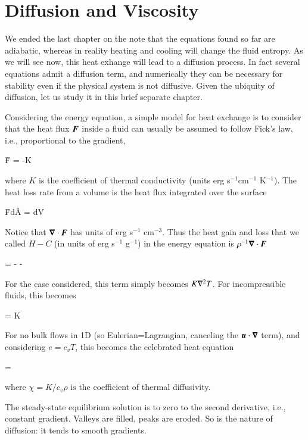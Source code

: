 \chapter{Diffusion and Viscosity}

We ended the last chapter on the note that the equations found so far
are adiabatic, whereas in reality heating and cooling will change the
fluid entropy. As we will see now, this heat exhange will lead to a diffusion
process. In fact several equations admit a diffusion term, and
numerically they can be necessary for stability even if the physical
system is not diffusive. Given the ubiquity of diffusion, let us study
it in this brief separate chapter. 

Considering the energy equation, a simple model for heat exchange is to consider that the heat flux ${\boldsymbol{F}}$ inside a
fluid can usually be assumed to follow Fick's law, i.e., proportional
to the gradient, 

\beq
\v{F} = -K
\eeq

\noindent where $K$ is the coefficient of thermal conductivity (units erg s$^{-1}$cm$^{-1}$ K$^{-1}$). The heat loss
rate from a volume is the heat flux integrated over the surface

\beq
\oint \v{F}\cdot d\v{A} = \int  {} dV
\eeq

\noindent Notice that ${\boldsymbol{\nabla}}\cdot{{\boldsymbol{F}}}$ has units of erg s$^{-1}$
cm$^{-3}$. Thus the heat gain and loss that
we called $H-C$ (in units of erg s$^{-1}$ g$^{-1}$) in the energy equation is 
$\rho^{-1}{\boldsymbol{\nabla}}\cdot{{\boldsymbol{F}}}$

\beq
{} = -   -
\eeq

For the case considered, this term simply becomes $K\nabla^2{T}$. For
incompressible fluids, this becomes 

\beq
\rho{} = K
\eeq

For no bulk flows in 1D (so Eulerian=Lagrangian, canceling the
${\boldsymbol{u}}\cdot{\boldsymbol{\nabla}}$ term), and considering $e=c_v T$, this becomes the
celebrated heat equation

\beq
{} = \chi {}
\label{eq:heat-equation}
\eeq

\noindent where $\chi = K/c_v \rho$ is the coefficient of thermal
diffusivity.  

The steady-state equilibrium solution is to
zero to the second derivative, i.e., constant gradient. Valleys are
filled, peaks are eroded. So is the nature of diffusion: it tends to
smooth gradients. 


